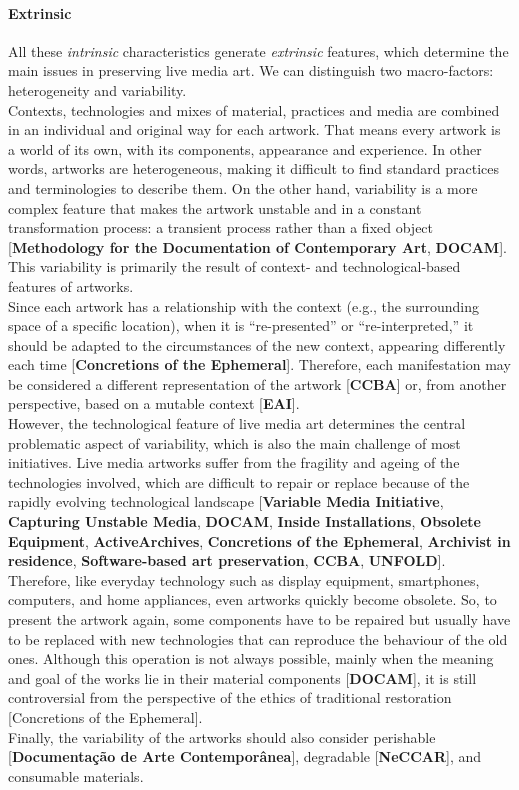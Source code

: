 \paragraph*{Extrinsic}
All these \textit{intrinsic} characteristics generate \textit{extrinsic} features, which determine the main issues in preserving live media art. We can distinguish two macro-factors: heterogeneity and variability.\\
Contexts, technologies and mixes of material, practices and media are combined in an individual and original way for each artwork. That means every artwork is a world of its own, with its components, appearance and experience. In other words, artworks are heterogeneous, making it difficult to find standard practices and terminologies to describe them. 
On the other hand, variability is a more complex feature that makes the artwork unstable and in a constant transformation process: a transient process rather than a fixed object [\textbf{Methodology for the Documentation of Contemporary Art}, \textbf{DOCAM}]. This variability is primarily the result of context- and technological-based features of artworks.\\
Since each artwork has a relationship with the context (e.g., the surrounding space of a specific location), when it is ``re-presented'' or ``re-interpreted,'' it should be adapted to the circumstances of the new context, appearing differently each time [\textbf{Concretions of the Ephemeral}]. Therefore, each manifestation may be considered a different representation of the artwork [\textbf{CCBA}] or, from another perspective, based on a mutable context [\textbf{EAI}].\\
However, the technological feature of live media art determines the central problematic aspect of variability, which is also the main challenge of most initiatives. Live media artworks suffer from the fragility and ageing of the technologies involved, which are difficult to repair or replace because of the rapidly evolving technological landscape [\textbf{Variable Media Initiative},\textbf{ Capturing Unstable Media}, \textbf{DOCAM}, \textbf{Inside Installations}, \textbf{Obsolete Equipment}, \textbf{ActiveArchives}, \textbf{Concretions of the Ephemeral}, \textbf{Archivist in residence}, \textbf{Software-based art preservation}, \textbf{CCBA}, \textbf{UNFOLD}]. Therefore, like everyday technology such as display equipment, smartphones, computers, and home appliances, even artworks quickly become obsolete. So, to present the artwork again, some components have to be repaired but usually have to be replaced with new technologies that can reproduce the behaviour of the old ones. Although this operation is not always possible, mainly when the meaning and goal of the works lie in their material components [\textbf{DOCAM}], it is still controversial from the perspective of the ethics of traditional restoration [Concretions of the Ephemeral].\\
Finally, the variability of the artworks should also consider perishable [\textbf{Documentação de Arte Contemporânea}], degradable [\textbf{NeCCAR}], and consumable materials.

